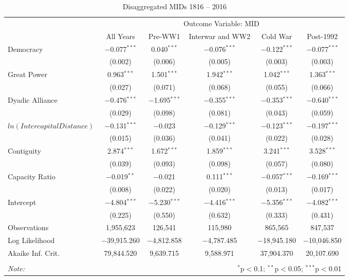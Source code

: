 
\begin{table}[!htbp] \centering 
  \caption{Disaggregated MIDs 1816 -- 2016\label{dis_mid}} 
  
\tiny 
\begin{tabular}{lccccc} 
\toprule
 & \multicolumn{5}{c}{Outcome Variable: MID} \\ 
\cmidrule{2-6} 

 & All Years & Pre-WW1 & Interwar and WW2 & Cold War & Post-1992 \\ 

\midrule
 Democracy & $-$0.077$^{***}$ & 0.040$^{***}$ & $-$0.076$^{***}$ & $-$0.122$^{***}$ & $-$0.077$^{***}$ \\ 
& (0.002) & (0.006) & (0.005) & (0.003) & (0.003) \\ 
Great Power & 0.963$^{***}$ & 1.501$^{***}$ & 1.942$^{***}$ & 1.042$^{***}$ & 1.363$^{***}$ \\ 
& (0.027) & (0.071) & (0.068) & (0.055) & (0.066) \\ 
Dyadic Alliance & $-$0.476$^{***}$ & $-$1.695$^{***}$ & $-$0.355$^{***}$ & $-$0.353$^{***}$ & $-$0.640$^{***}$ \\ 
& (0.029) & (0.098) & (0.081) & (0.043) & (0.059) \\ 
$ln(Intercapital Distance)$ & $-$0.131$^{***}$ & $-$0.023 & $-$0.129$^{***}$ & $-$0.123$^{***}$ & $-$0.197$^{***}$ \\ 
& (0.015) & (0.036) & (0.041) & (0.022) & (0.028) \\ 
Contiguity & 2.874$^{***}$ & 1.672$^{***}$ & 1.859$^{***}$ & 3.241$^{***}$ & 3.528$^{***}$ \\ 
& (0.039) & (0.093) & (0.098) & (0.057) & (0.080) \\ 
Capacity Ratio & $-$0.019$^{**}$ & $-$0.021 & 0.111$^{***}$ & $-$0.057$^{***}$ & $-$0.169$^{***}$ \\ 
& (0.008) & (0.022) & (0.020) & (0.013) & (0.017) \\ 
Intercept & $-$4.804$^{***}$ & $-$5.230$^{***}$ & $-$4.416$^{***}$ & $-$5.356$^{***}$ & $-$4.082$^{***}$ \\ 
& (0.225) & (0.550) & (0.632) & (0.333) & (0.431) \\ 
\midrule
Observations & 1,955,623 & 126,541 & 115,980 & 865,565 & 847,537 \\ 
Log Likelihood & $-$39,915.260 & $-$4,812.858 & $-$4,787.485 & $-$18,945.180 & $-$10,046.850 \\ 
Akaike Inf. Crit. & 79,844.520 & 9,639.715 & 9,588.971 & 37,904.370 & 20,107.690 \\ 
\bottomrule \\[-1.8ex] 
\textit{Note:}  & \multicolumn{5}{r}{$^{*}$p$<$0.1; $^{**}$p$<$0.05; $^{***}$p$<$0.01} \\ 
\end{tabular} 
\end{table} 
